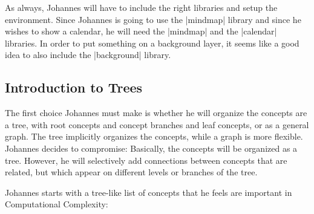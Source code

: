 As always, Johannes will have to include the right libraries and
setup the environment. Since Johannes is going to use the
|mindmap| library and since he wishes to show a calendar, he will need
the |mindmap| and the |calendar| libraries. In order to put something
on a background layer, it seems like a good idea to also include the
|background| library.


\subsection{Introduction to Trees}

The first choice Johannes must make is whether he will organize the
concepts are a tree, with root concepts and concept branches and leaf
concepts, or as a general graph. The tree implicitly organizes the
concepts, while a graph is more flexible. Johannes decides to
compromise: Basically, the concepts will be organized as a
tree. However, he will selectively add connections between concepts
that are related, but which appear on different levels or branches of
the tree.

Johannes starts with a tree-like list of concepts that he feels are
important in Computational Complexity:

